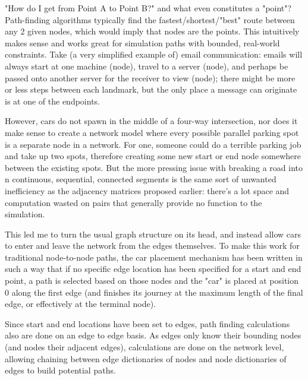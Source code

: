 \par "How do I get from Point A to Point B?" and what even constitutes a "point"?  Path-finding algorithms typically find the fastest/shortest/"best" route between any 2 given nodes, which would imply that nodes are the points. This intuitively makes sense and works great for simulation paths with bounded, real-world constraints.  Take (a very simplified example of) email communication:  emails will always start at one machine (node), travel to a server (node), and perhaps be passed onto another server for the receiver to view (node); there might be more or less steps between each landmark, but the only place a message can originate is at one of the endpoints.  \\

\par However, cars do not spawn in the middle of a four-way intersection, nor does it make sense to create a network model where every possible parallel parking spot is a separate node in a network.  For one, someone could do a terrible parking job and take up two spots, therefore creating some new start or end node somewhere between the existing spots.  But the more pressing issue with breaking a road into n continuous, sequential, connected segments is the same sort of unwanted inefficiency as the adjacency matrices proposed earlier:  there's a lot space and computation wasted on pairs that generally provide no function to the simulation. \\

\par This led me to turn the usual graph structure on its head, and instead allow cars to enter and leave the network from the edges themselves.  To make this work for traditional node-to-node paths, the car placement mechanism has been written in such a way that if no specific edge location has been specified for a start and end point, a path is selected based on those nodes and the "car" is placed at position 0 along the first edge (and finishes its journey at the maximum length of the final edge, or effectively at the terminal node). \\

\par Since start and end locations have been set to edges, path finding calculations also are done on an edge to edge basis.  As edges only know their bounding nodes (and nodes their adjacent edges), calculations are done on the network level, allowing chaining between edge dictionaries of nodes and node dictionaries of edges to build potential paths.


